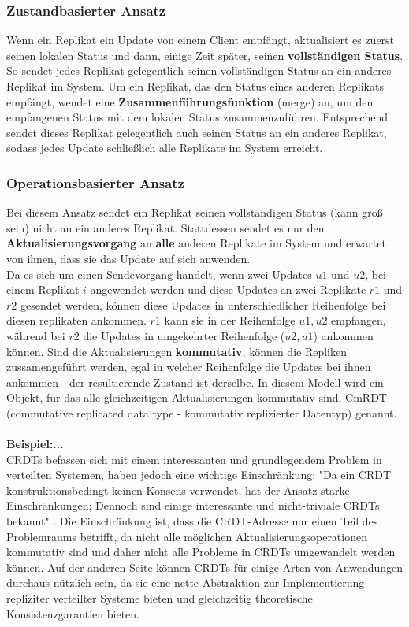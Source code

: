 \subsubsection{Zustandbasierter Ansatz}
Wenn ein Replikat ein Update von einem Client empfängt, aktualisiert es zuerst seinen lokalen Status und dann, einige Zeit später, seinen \textbf{vollständigen Status}. So sendet jedes Replikat gelegentlich seinen vollständigen Status an ein anderes Replikat im System. Um ein Replikat, das den Status eines anderen Replikats empfängt, wendet eine \textbf{Zusammenführungsfunktion} (merge) an, um den empfangenen Status mit dem lokalen Status zusammenzuführen. Entsprechend sendet dieses Replikat gelegentlich auch seinen Status an ein anderes Replikat, sodass jedes Update schließlich alle Replikate im System erreicht.
\subsubsection{Operationsbasierter Ansatz}
Bei diesem Ansatz sendet ein Replikat seinen vollständigen Status (kann groß sein) nicht an ein anderes Replikat. Stattdessen sendet es nur den \textbf{Aktualisierungsvorgang} an \textbf{alle} anderen Replikate im System und erwartet von ihnen, dass sie das Update auf sich anwenden.\\
Da es sich um einen Sendevorgang handelt, wenn zwei Updates $u1$ und $u2$, bei einem Replikat $i$ angewendet werden und diese Updates an zwei Replikate $r1$ und $r2$ gesendet werden, können diese Updates in unterschiedlicher Reihenfolge bei diesen replikaten ankommen. $r1$ kann sie in der Reihenfolge $u1, u2$ empfangen, während bei $r2$ die Updates in umgekehrter Reihenfolge ($u2, u1$) ankommen können. Sind die Aktualisierungen \textbf{kommutativ}, können die Repliken zussamengeführt werden, egal in welcher Reihenfolge die Updates bei ihnen ankommen - der resultierende Zustand ist derselbe. In diesem Modell wird ein Objekt, für das alle gleichzeitigen Aktualisierungen kommutativ sind, CmRDT (commutative replicated data type - kommutativ replizierter Datentyp) genannt. \\\\
\textbf{Beispiel:...}\\
CRDTs befassen sich mit einem interessanten und grundlegendem Problem in verteilten Systemen, haben jedoch eine wichtige Einschränkung: "Da ein CRDT konstruktionsbedingt keinen Konsens verwendet, hat der Ansatz starke Einschränkungen; Dennoch sind einige interessante und nicht-triviale CRDTs bekannt" \cite{crdt_shapiro2}. Die Einschränkung ist, dass die CRDT-Adresse nur einen Teil des Problemraums betrifft, da nicht alle möglichen Aktualisierungsoperationen kommutativ sind und daher nicht alle Probleme in CRDTs umgewandelt werden können. Auf der anderen Seite können CRDTs für einige Arten von Anwendungen durchaus nützlich sein, da sie eine nette Abstraktion zur Implementierung repliziter verteilter Systeme bieten und gleichzeitig theoretische Konsistenzgarantien bieten.
%
%
